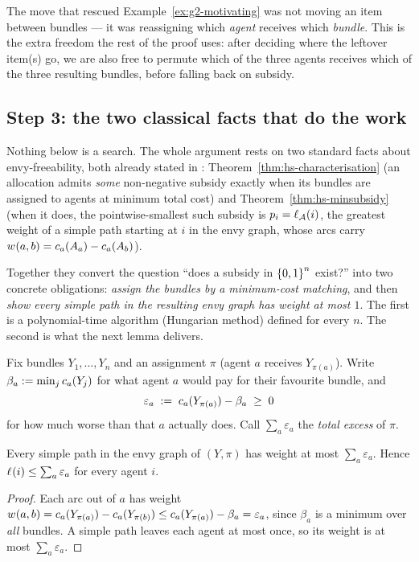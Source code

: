 The move that rescued Example~\ref{ex:g2-motivating} was not moving an item between
bundles --- it was reassigning which \emph{agent} receives which
\emph{bundle}. This is the extra freedom the rest of the proof uses: after
deciding where the leftover item(s) go, we are also free to permute which of
the three agents receives which of the three resulting bundles, before
falling back on subsidy.

\subsection{Step 3: the two classical facts that do the work}
\label{sec:g2-hs}

Nothing below is a search. The whole argument rests on two standard facts
about envy-freeability, both already stated in
: Theorem~\ref{thm:hs-characterisation} (an allocation admits
\emph{some} non-negative subsidy exactly when its bundles are assigned to
agents at minimum total cost) and Theorem~\ref{thm:hs-minsubsidy} (when it does,
the pointwise-smallest such subsidy is $p_i = \ell_{\mathcal{A}}(i)$, the
greatest weight of a simple path starting at $i$ in the envy graph, whose
arcs carry $w_{}(a,b) = c_a(A_{a}) - c_a(A_{b})$).

Together they convert the question ``does a subsidy in $\left\{0,1\right\}^n$ exist?''
into two concrete obligations: \emph{assign the bundles by a minimum-cost
matching}, and then \emph{show every simple path in the resulting envy graph
has weight at most $1$}. The first is a polynomial-time algorithm (Hungarian
method) defined for every $n$. The second is what the next lemma delivers.

\begin{definition}[Excess]
\label{def:g2-excess}
Fix bundles $Y_1,\dots,Y_n$ and an assignment $\pi$ (agent $a$ receives
$Y_{\pi(a)}$). Write $\beta_a := \min_j c_a(Y_j)$ for what agent $a$
would pay for their favourite bundle, and
\[
  \varepsilon_a \;:=\; c_a(Y_{\pi(a)}) - \beta_a \;\ge\; 0
\]
for how much worse than that $a$ actually does. Call $\sum_a \varepsilon_a$
the \emph{total excess} of $\pi$.
\end{definition}

\begin{lemma}
\label{lem:g2-pathbound}
Every simple path in the envy graph of $(Y,\pi)$ has weight at most
$\sum_a \varepsilon_a$. Hence $\ell_{}(i) \le \sum_a \varepsilon_a$ for every
agent $i$.
\end{lemma}
\begin{proof}
Each arc out of $a$ has weight $w_{}(a,b) = c_a(Y_{\pi(a)}) -
c_a(Y_{\pi(b)}) \le c_a(Y_{\pi(a)}) - \beta_a = \varepsilon_a$,
since $\beta_a$ is a minimum over \emph{all} bundles. A simple path leaves
each agent at most once, so its weight is at most $\sum_a \varepsilon_a$.
\end{proof}

